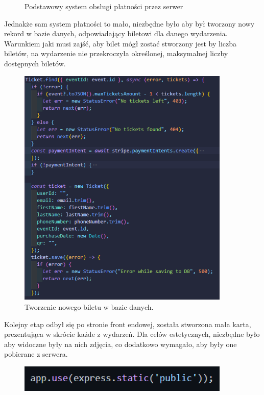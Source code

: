 \documentclass[12pt]{article}
\begin{document}
\begin{sloppypar}
{\begin{figure}[H]
    \caption{Podstawowy system obsługi płatności przez serwer}
    \label{fig:server-stripe}
  \end{figure}
  Jednakże sam system płatności to mało, niezbędne było aby był tworzony nowy rekord w bazie danych, odpowiadający biletowi dla danego wydarzenia. 
  Warunkiem jaki musi zajść, aby bilet mógł zostać stworzony jest by liczba biletów, na wydarzenie nie przekroczyła określonej, maksymalnej liczby dostępnych biletów.
  \begin{figure}[H]
    \centering
    \includegraphics[width=0.9\textwidth]{Creation_process/Ticket_DB.PNG}
    \caption{Tworzenie nowego biletu w bazie danych.}
    \label{fig:ticket-db}
  \end{figure}
  Kolejny etap odbył się po stronie front endowej, została stworzona mała karta, prezentująca w skrócie każde z wydarzeń. Dla celów estetycznych, niezbędne było 
  aby widoczne były na nich zdjęcia, co dodatkowo wymagało, aby były one pobierane z serwera.
  \begin{figure}[H]
    \centering
    \includegraphics[width=0.9\textwidth]{Creation_process/static_folder.PNG}

\end{figure}}
\end{sloppypar}
\end{document}
